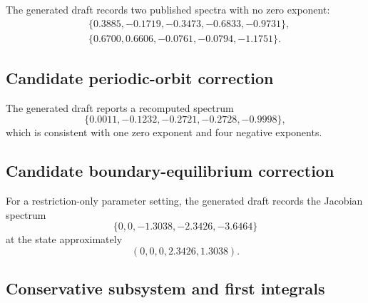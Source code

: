 \documentclass[11pt, reqno]{amsart}
\theoremstyle{definition}
\theoremstyle{remark}
\begin{document}
	The generated draft records two published spectra with no zero exponent:
	\begin{equation}
		\label{eq:reported-spectra}
		\begin{aligned}
			&\{0.3885,-0.1719,-0.3473,-0.6833,-0.9731\},\\
			&\{0.6700,0.6606,-0.0761,-0.0794,-1.1751\}.
		\end{aligned}
	\end{equation}
	
	
	\subsection{Candidate periodic-orbit correction}
	
	The generated draft reports a recomputed spectrum
	\begin{equation}
		\label{eq:recomputed-cycle-spectrum}
		\{0.0011,-0.1232,-0.2721,-0.2728,-0.9998\},
	\end{equation}
	which is consistent with one zero exponent and four negative exponents.
	
	
	\subsection{Candidate boundary-equilibrium correction}
	
	For a restriction-only parameter setting, the generated draft records the
	Jacobian spectrum
	\begin{equation}
		\label{eq:boundary-equilibrium-spectrum}
		\{0,0,-1.3038,-2.3426,-3.6464\}
	\end{equation}
	at the state approximately
	\[
	(0,0,0,2.3426,1.3038).
	\]
	
	
	\subsection{Conservative subsystem and first integrals}
	
\end{document}
